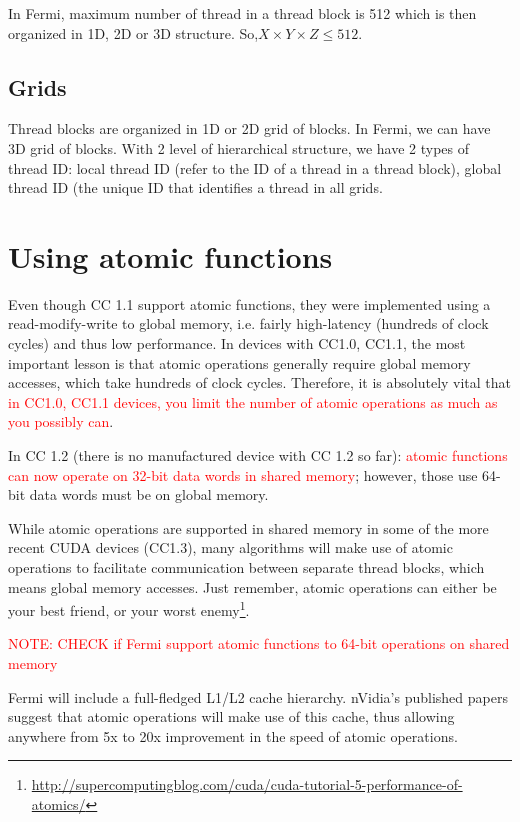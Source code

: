 In Fermi, maximum number of thread in a thread block is 512 which is
then organized in 1D, 2D or 3D structure. So,$X\times Y\times Z\le
512$.

\subsection{Grids}
\label{sec:grids}

Thread blocks are organized in 1D or 2D grid of blocks. In Fermi, we
can have 3D grid of blocks. With 2 level of hierarchical structure, we
have 2 types of thread ID: local thread ID (refer to the ID of a
thread in a thread block), global thread ID (the unique ID that
identifies a thread in all grids. 


\section{Using atomic functions}
\label{sec:using-atom-funct}

Even though CC 1.1 support atomic functions, they were implemented
using a read-modify-write to global memory, i.e. fairly high-latency
(hundreds of clock cycles) and thus low performance.  In devices with
CC1.0, CC1.1, the most important lesson is that atomic operations
generally require global memory accesses, which take hundreds of clock
cycles. Therefore, it is absolutely vital that
\textcolor{red}{in CC1.0, CC1.1 devices, you limit the number of
  atomic operations as much as you possibly can}.

In CC 1.2 (there is no manufactured device with CC 1.2 so far):
\textcolor{red}{atomic functions can now operate on 32-bit data words
  in shared memory};
however, those use 64-bit data words must be on global memory.

While atomic operations are supported in shared memory in some of the
more recent CUDA devices (CC1.3), many algorithms will make use of
atomic operations to facilitate communication between separate thread
blocks, which means global memory accesses. Just remember, atomic
operations can either be your best friend, or your worst
enemy\footnote{\url{http://supercomputingblog.com/cuda/cuda-tutorial-5-performance-of-atomics/}}.


\textcolor{red}{NOTE: CHECK if Fermi support atomic functions to
  64-bit operations on shared memory}

Fermi will include a full-fledged L1/L2 cache hierarchy. nVidia's
published papers suggest that atomic operations will make use of this
cache, thus allowing anywhere from 5x to 20x improvement in the speed
of atomic operations.


